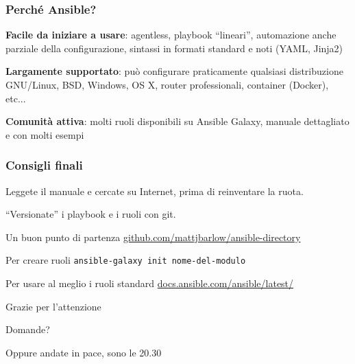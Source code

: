 \documentclass{beamer}
\begin{document}
\begin{frame}
\frametitle{Perché Ansible?}

\textbf{Facile da iniziare a usare}: agentless, playbook ``lineari'', automazione anche parziale della configurazione, sintassi in formati standard e noti (YAML, Jinja2)

\textbf{Largamente supportato}: può configurare praticamente qualsiasi distribuzione GNU/Linux, BSD, Windows, OS X, router professionali, container (Docker), etc...

\textbf{Comunità attiva}: molti ruoli disponibili su Ansible Galaxy, manuale dettagliato e con molti esempi


\end{frame}

\begin{frame}
\frametitle{Consigli finali}

Leggete il manuale e cercate su Internet, prima di reinventare la ruota.

``Versionate'' i playbook e i ruoli con git.

\vspace{1em}

\begin{alertblock}{Un buon punto di partenza}
	\href{https://github.com/mattjbarlow/ansible-directory}{github.com/mattjbarlow/ansible-directory}
\end{alertblock}

\begin{alertblock}{Per creare ruoli}
	\texttt{ansible-galaxy init nome-del-modulo}
\end{alertblock}

\begin{alertblock}{Per usare al meglio i ruoli standard}
	\href{https://docs.ansible.com/ansible/latest/}{docs.ansible.com/ansible/latest/}
\end{alertblock}

\end{frame}

\begin{frame}

{\Huge Grazie per l'attenzione}

\end{frame}

\begin{frame}

{\Huge Domande?}

\vspace{2em}

Oppure andate in pace, sono le 20.30

\end{frame}
\end{document}
